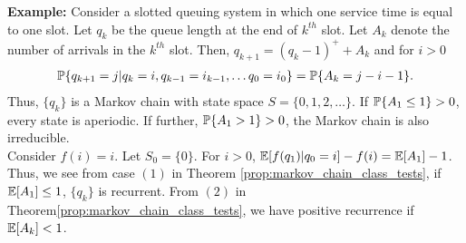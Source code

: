 \documentclass[all-lectures.tex]{subfiles}
\begin{document}
\indent \textbf{Example:} Consider a slotted queuing system in which one service time is equal to one slot. Let $q_k$ be the queue length at the end of $k^{th}$ slot. Let $A_k$ denote the number of arrivals in the $k^{th}$ slot. Then, $q_{k+1} = (q_k -1)^+ + A_{k}$ and for $i>0$
\begin{align*}
\P\{q_{k+1} = j|q_k = i,q_{k-1} = i_{k-1}, \dots q_0 = i_0\} = \P\{A_k = j-i-1\}.
\end{align*}
Thus, $\{q_k\}$ is a Markov chain with state space $S = \{0,1,2,\dots\}$. If $\P\{A_1 \leq 1\} > 0$, every state is aperiodic. If further, $\P\{A_1 > 1\} >0$, the Markov chain is also irreducible. \\
\indent Consider $f(i) = i$. Let $S_0 = \{0\}$. For $i> 0$, $\E[f(q_1)|q_0 = i] - f(i) = \E[A_1] -1 $. Thus, we see from case $(1)$ in Theorem \ref{prop:markov_chain_class_tests}, if $\E[A_1] \leq 1 $, $\{q_k\}$ is recurrent. From $(2)$ in Theorem\ref{prop:markov_chain_class_tests}, we have positive recurrence if $\E[A_k] < 1$. \\
\end{document}
